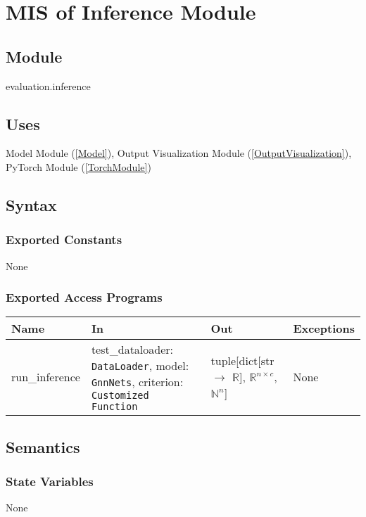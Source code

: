 \documentclass[12pt, titlepage]{article}
\begin{document}
\newpage








\section{MIS of Inference Module} \label{Test}

\subsection{Module}
evaluation.inference

\subsection{Uses}
Model Module (\ref{Model}), Output Visualization Module (\ref{OutputVisualization}), PyTorch Module (\ref{TorchModule})

\subsection{Syntax}

\subsubsection{Exported Constants}
None

\subsubsection{Exported Access Programs}
\begin{center}
\begin{tabular}{p{3cm} p{6cm} p{5cm} p{2.5cm}}
\hline
\textbf{Name} & \textbf{In} & \textbf{Out} & \textbf{Exceptions} \\
\hline
run\_inference & test\_dataloader: \texttt{DataLoader}, model: \texttt{GnnNets}, criterion: \texttt{Customized Function} & tuple[dict[str $\rightarrow$ \(\mathbb{R}\)], \(\mathbb{R}^{n \times c}\), \(\mathbb{N}^n\)] & None \\
\hline
\end{tabular}
\end{center}

\subsection{Semantics}

\subsubsection{State Variables}
None
\end{document}
